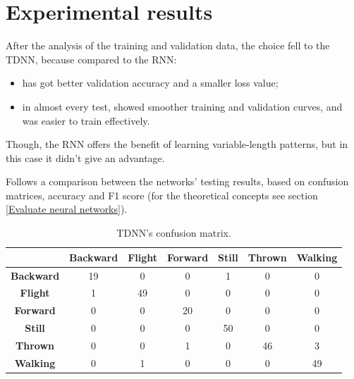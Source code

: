 \chapter{Experimental results}
After the analysis of the training and validation data, the choice fell to the TDNN, because compared to the RNN:
\begin{itemize}
	\item has got better validation accuracy and a smaller loss value;
	\item in almost every test, showed smoother training and validation curves, and was easier to train effectively.
\end{itemize}
Though, the RNN offers the benefit of learning variable-length patterns, but in this case it didn't give an advantage.
\bigbreak

Follows a comparison between the networks' testing results, based on confusion matrices, accuracy and F1 score (for the theoretical concepts see section \ref{Evaluate neural networks}).

\begin{table}[ht!]
	\centering
	\begin{tabular}{c|cccccc}
		& \textbf{Backward} & \textbf{Flight} & \textbf{Forward} & \textbf{Still} & \textbf{Thrown} & \textbf{Walking} \\ \hline
		\textbf{Backward} & 19                & 0               & 0                & 1              & 0               & 0                \\
		\rowcolor[HTML]{EFEFEF} 
		\textbf{Flight}   & 1                 & 49              & 0                & 0              & 0               & 0                \\
		\textbf{Forward}  & 0                 & 0               & 20               & 0              & 0               & 0                \\
		\rowcolor[HTML]{EFEFEF} 
		\textbf{Still}    & 0                 & 0               & 0                & 50             & 0               & 0                \\
		\textbf{Thrown}   & 0                 & 0               & 1                & 0              & 46              & 3                \\
		\rowcolor[HTML]{EFEFEF} 
		\textbf{Walking}  & 0                 & 1               & 0                & 0              & 0               & 49              
	\end{tabular}
	\caption{TDNN's confusion matrix.}
\end{table}

